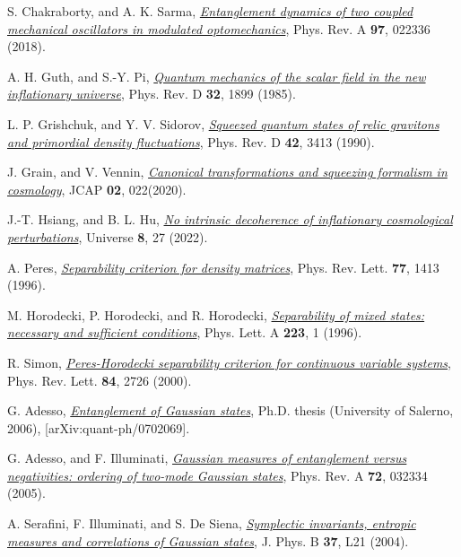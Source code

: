 \documentclass[11pt,a4paper]{article}
\begin{document}
\begin{thebibliography}{99}
    S. Chakraborty, and A. K. Sarma, \href{https://doi.org/10.1103/PhysRevA.97.022336}{\textit{Entanglement dynamics of two coupled mechanical oscillators in modulated optomechanics}}, Phys. Rev. A \textbf{97}, 022336 (2018).

    A. H. Guth, and S.-Y. Pi, \href{https://doi.org/10.1103/PhysRevD.32.1899}{\textit{Quantum mechanics of the scalar field in the new inflationary universe}}, Phys. Rev. D \textbf{32}, 1899 (1985).

    L. P. Grishchuk, and Y. V. Sidorov, \href{https://doi.org/10.1103/PhysRevD.42.3413}{\textit{Squeezed quantum states of relic gravitons and primordial density fluctuations}}, Phys. Rev. D \textbf{42}, 3413 (1990).

    J. Grain, and V. Vennin, \href{https://doi.org/10.1088/1475-7516/2020/02/022}{\textit{Canonical transformations and squeezing formalism in cosmology}}, JCAP \textbf{02}, 022(2020).

    J.-T. Hsiang, and B. L. Hu, \href{https://doi.org/10.3390/e24121814}{\textit{No intrinsic decoherence of inflationary cosmological perturbations}}, Universe \textbf{8}, 27 (2022).

    A. Peres, \href{https://doi.org/10.1103/PhysRevLett.77.1413}{\textit{Separability criterion for density matrices}}, Phys. Rev. Lett. \textbf{77}, 1413 (1996).

    M. Horodecki, P. Horodecki, and R. Horodecki, \href{https://doi.org/10.1016/S0375-9601(96)00706-2}{\textit{Separability of mixed states: necessary and sufficient conditions}}, Phys. Lett. A \textbf{223}, 1 (1996).

    R. Simon, \href{https://doi.org/10.1103/PhysRevLett.84.2726}{\textit{Peres-Horodecki separability criterion for continuous variable systems}}, Phys. Rev. Lett. \textbf{84}, 2726 (2000).

    G. Adesso, \href{https://doi.org/10.48550/arXiv.quant-ph/0702069}{\textit{Entanglement of Gaussian states}}, Ph.D. thesis (University of Salerno, 2006), [arXiv:quant-ph/0702069].

    G. Adesso, and F. Illuminati, \href{https://doi.org/10.1103/PhysRevA.72.032334}{\textit{Gaussian measures of entanglement versus negativities: ordering of two-mode Gaussian states}}, Phys. Rev. A \textbf{72}, 032334 (2005).

    A. Serafini, F. Illuminati, and S. De Siena, \href{https://doi.org/10.1088/0953-4075/37/2/L02}{\textit{Symplectic invariants, entropic measures and correlations of Gaussian states}}, J. Phys. B \textbf{37}, L21 (2004).


\end{thebibliography}
\end{document}
